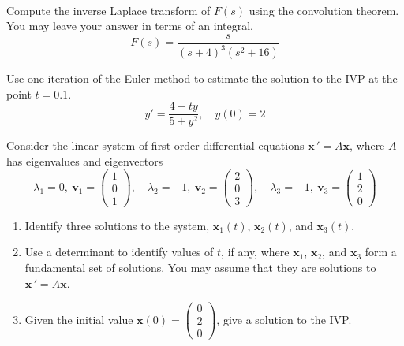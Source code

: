 \documentclass[12pt]{exam}
\begin{document}
    


\newpage \Initials \\

\begin{questions}


    \question[6] %
    Compute the inverse Laplace transform of $F(s)$ using the convolution theorem. You may leave your answer in terms of an integral. 
    $$F(s) = \frac{s}{(s+4)^3(s^2+16)}$$  %
    
    \vspace{8cm} 
    
    \question[2] %
    Use one iteration of the Euler method to estimate the solution to the IVP at the point $t = 0.1$. 
    $$y' = \frac{4 - ty}{5 + y^2}, \quad y(0) = 2$$ %
    
    
    
\newpage \Initials

    \question[6] Consider the linear system of first order differential equations $\displaystyle \mathbf x \, ' = A \mathbf x$, where $A$ has eigenvalues and eigenvectors 
    $$\lambda_1 = 0, \ \mathbf v_1 = \begin{pmatrix} 1 \\ 0 \\ 1 \end{pmatrix}, 
    \quad \lambda _2 = -1 , \  \mathbf v_2 = \begin{pmatrix} 2 \\ 0 \\ 3 \end{pmatrix}, 
    \quad \lambda _3 = -1 , \  \mathbf v_3 = \begin{pmatrix} 1 \\ 2 \\ 0 \end{pmatrix} 
    $$
    
    \begin{enumerate}[label=\roman*)]
      \item Identify three solutions to the system, $\mathbf x_1(t)$, $\mathbf x_2(t)$, and $\mathbf x_3(t)$. 
      \vspace{3cm} 
      \item Use a determinant to identify values of $t$, if any, where $\mathbf x_1$, $\mathbf x_2$, and $\mathbf x_3$ form a fundamental set of solutions. You may assume that they are solutions to $\mathbf x \, ' = A\mathbf x$. 
      \vspace{3cm}
      \item Given the initial value $\mathbf x(0) = \begin{pmatrix}0\\2\\0\end{pmatrix}$, give a solution to the IVP.  
      

\end{enumerate}
\end{questions}
\end{document}
